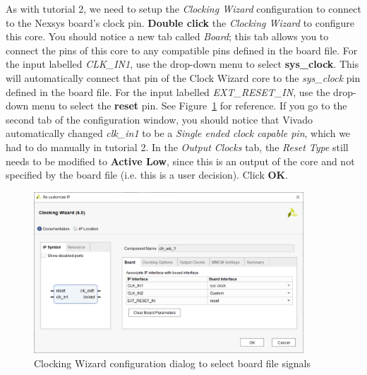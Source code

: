 \documentclass[11pt]{article}
\begin{document}
As with tutorial 2, we need to setup the \textit{Clocking Wizard} configuration to connect to the Nexsys board's clock pin. \textbf{Double click} the \textit{Clocking Wizard} to configure this core. You should notice a new tab called \textit{Board}; this tab allows you to connect the pins of this core to any compatible pins defined in the board file. For the input labelled \textit{CLK\_IN1}, use the drop-down menu to select \textbf{sys\_clock}. This will automatically connect that pin of the Clock Wizard core to the \textit{sys\_clock} pin defined in the board file. For the input labelled \textit{EXT\_RESET\_IN}, use the drop-down menu to select the \textbf{reset} pin. See Figure~\ref{fig:config_clock_wiz} for reference. If you go to the second tab of the configuration window, you should notice that Vivado automatically changed \textit{clk\_in1} to be a \textit{Single ended clock capable pin}, which we had to do manually in tutorial 2. In the \textit{Output Clocks} tab, the \textit{Reset Type} still needs to be modified to \textbf{Active Low}, since this is an output of the core and not specified by the board file (i.e. this is a user decision). Click \textbf{OK}.

\begin{figure}[h]
    \centering
    \includegraphics[width=0.9\textwidth]{images/config_clock_wiz.png}
    \caption{Clocking Wizard configuration dialog to select board file signals}
    \label{fig:config_clock_wiz}
\end{figure}
\end{document}

